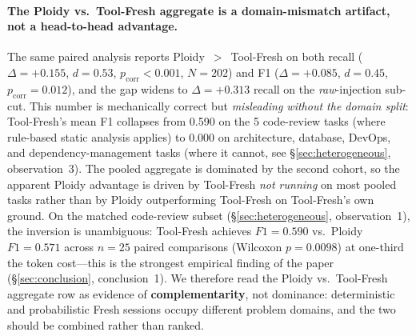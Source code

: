 \documentclass[11pt]{article}
\begin{document}
\paragraph{The Ploidy vs.\ Tool-Fresh aggregate is a domain-mismatch artifact, not a head-to-head advantage.} The same paired analysis reports Ploidy~$>$~Tool-Fresh on both recall ($\Delta = +0.155$, $d = 0.53$, $p_\text{corr} < 0.001$, $N = 202$) and F1 ($\Delta = +0.085$, $d = 0.45$, $p_\text{corr} = 0.012$), and the gap widens to $\Delta = +0.313$ recall on the \emph{raw}-injection sub-cut. This number is mechanically correct but \emph{misleading without the domain split}: Tool-Fresh's mean F1 collapses from 0.590 on the 5 code-review tasks (where rule-based static analysis applies) to 0.000 on architecture, database, DevOps, and dependency-management tasks (where it cannot, see \S\ref{sec:heterogeneous}, observation~3). The pooled aggregate is dominated by the second cohort, so the apparent Ploidy advantage is driven by Tool-Fresh \emph{not running} on most pooled tasks rather than by Ploidy outperforming Tool-Fresh on Tool-Fresh's own ground. On the matched code-review subset (\S\ref{sec:heterogeneous}, observation~1), the inversion is unambiguous: Tool-Fresh achieves $F1 = 0.590$ vs.\ Ploidy $F1 = 0.571$ across $n = 25$ paired comparisons (Wilcoxon $p = 0.0098$) at one-third the token cost---this is the strongest empirical finding of the paper (\S\ref{sec:conclusion}, conclusion~1). We therefore read the Ploidy vs.\ Tool-Fresh aggregate row as evidence of \textbf{complementarity}, not dominance: deterministic and probabilistic Fresh sessions occupy different problem domains, and the two should be combined rather than ranked.
\end{document}
